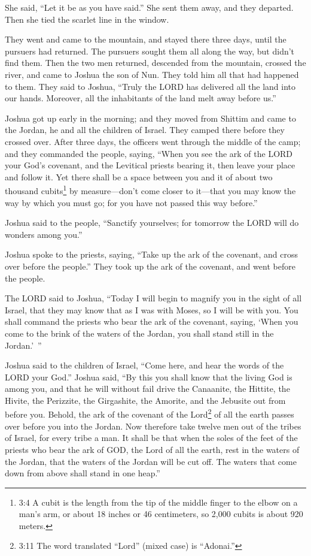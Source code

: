 \myverse{}She said, “Let it be as you have said.” She sent them away, and
they departed. Then she tied the scarlet line in the window.

\myverse{}They went and came to the mountain, and stayed there three days,
until the pursuers had returned. The pursuers sought them all along the way, but didn’t find them.
\myverse{}Then the two men returned, descended from the mountain, crossed the river,
and came to Joshua the son of Nun. They told him all that had happened to them.
\myverse{}They said to Joshua, “Truly the LORD has delivered all the land into our hands.
Moreover, all the inhabitants of the land melt away before us.”


\mychapter{} \myverse*{}Joshua got up early in the morning; and they moved from Shittim
and came to the Jordan, he and all the children of Israel. They camped there before they crossed over.
\myverse{}After three days, the officers went through the middle of the camp;
\myverse{}and they commanded the people, saying, “When you see the ark of the LORD your
God’s covenant, and the Levitical priests bearing it, then leave your place and follow it.
\myverse{}Yet there shall be a space between you and it of about two thousand cubits\footnote{3:4 A cubit is the length from the tip of the middle finger to the elbow on a man’s arm, or about
	18 inches or 46 centimeters, so 2,000 cubits is about 920 meters.} by measure—don’t come closer
to it—that you may know the way by which you must go; for you have not passed this way before.”

\myverse{}Joshua said to the people, “Sanctify yourselves; for tomorrow the
LORD will do wonders among you.”

\myverse{}Joshua spoke to the priests, saying, “Take up the ark of the covenant,
and cross over before the people.” They took up the ark of the covenant, and went before the people.

\myverse{}The LORD said to Joshua, “Today I will begin to magnify you in
the sight of all Israel, that they may know that as I was with Moses, so I will be with you.
\myverse{}You shall command the priests who bear the ark of the covenant, saying, ‘When
you come to the brink of the waters of the Jordan, you shall stand still in the Jordan.’ ”

\myverse{}Joshua said to the children of Israel, “Come here, and hear the
words of the LORD your God.”
\myverse{}Joshua said, “By this you shall know that the living God is among you, and
that he will without fail drive the Canaanite, the Hittite, the Hivite, the Perizzite, the Girgashite,
the Amorite, and the Jebusite out from before you.
\myverse{}Behold, the ark of the covenant of the Lord\footnote{3:11 The word translated “Lord” (mixed case) is “Adonai.”} of all the earth passes over before
you into the Jordan.
\myverse{}Now therefore take twelve men out of the tribes of Israel, for every tribe
a man.
\myverse{}It shall be that when the soles of the feet of the priests who bear the ark
of GOD, the Lord of all the earth, rest in the waters of the Jordan, that the waters of the Jordan will
be cut off. The waters that come down from above shall stand in one heap.”

